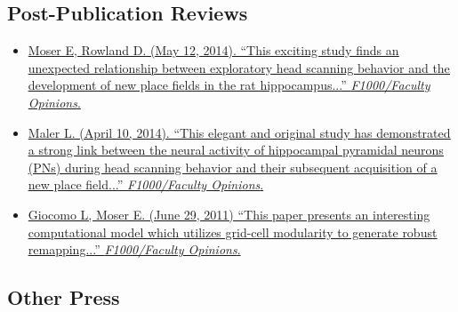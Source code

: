 \documentclass[10pt]{article}
\newcommand{\itemtitle}[1]{{\color{hopkinsblue}\ul{#1}}}
\begin{document}
\subsection*{Post-Publication Reviews}

\begin{itemize}
  \item \href{https://facultyopinions.com/prime/718333676#eval793494783}
    {Moser E, Rowland D. (May 12, 2014). ``\itemtitle{This exciting study finds
        an unexpected relationship between exploratory head scanning behavior
      and the development of new place fields in the rat hippocampus...}”
    \emph{F1000/Faculty Opinions}.}
  \item \href{https://facultyopinions.com/prime/718333676#eval793493493}
    {Maler L. (April 10, 2014). ``\itemtitle{This elegant and original study has
        demonstrated a strong link between the neural activity of hippocampal pyramidal
        neurons (PNs) during head scanning behavior and their subsequent acquisition of
    a new place field...}'' \emph{F1000/Faculty Opinions}.}
  \item \href{https://facultyopinions.com/prime/11553956}
    {Giocomo L, Moser E. (June 29, 2011) ``\itemtitle{This paper presents an
        interesting computational model which utilizes grid-cell modularity to generate
    robust remapping...}'' \emph{F1000/Faculty Opinions}.}
\end{itemize}

\subsection*{Other Press}
\end{document}
